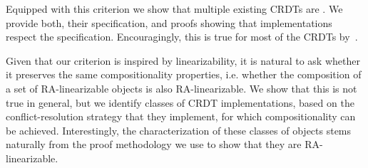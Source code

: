 Equipped with this criterion we show that multiple existing CRDTs are
\crdtlinearizable{}.
%
We provide both, their \CRDTLinshort{} specification, and proofs
showing that implementations respect the specification.
%
Encouragingly, this is true for most of the CRDTs
by~\citet{ShapiroPBZ11}.

Given that our criterion is inspired by
linearizability, it is natural to ask whether it
preserves the same compositionality properties, i.e.
whether the composition of a set of RA-linearizable objects is also RA-linearizable.
%
We show that this is not true in general, but we identify classes of
CRDT implementations, based on the conflict-resolution strategy that
they implement, for which compositionality can be achieved. Interestingly, the characterization of these 
classes of objects stems naturally from the proof methodology we use to show that they are RA-linearizable.




